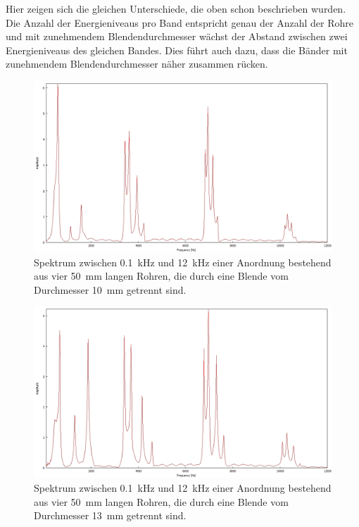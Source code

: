 Hier zeigen sich die gleichen Unterschiede, die oben schon beschrieben wurden.
Die Anzahl der Energieniveaus pro Band entspricht genau der Anzahl der Rohre und mit zunehmendem Blendendurchmesser wächst der Abstand zwischen zwei Energieniveaus des gleichen Bandes.
Dies führt auch dazu, dass die Bänder mit zunehmendem Blendendurchmesser näher zusammen rücken.
\begin{figure}
\centering
\includegraphics[width=\textwidth]{content/messungen/Chapter4b/4b_4_4_10.jpg}
\caption{Spektrum zwischen 0.1~kHz und 12~kHz einer Anordnung bestehend aus vier 50~mm langen Rohren, die durch eine Blende vom Durchmesser 10~mm getrennt sind.}
\label{fig:4b_4_4_10}
\end{figure}
\begin{figure}
\centering
\includegraphics[width=\textwidth]{content/messungen/Chapter4b/4b_4_4_13.jpg}
\caption{Spektrum zwischen 0.1~kHz und 12~kHz einer Anordnung bestehend aus vier 50~mm langen Rohren, die durch eine Blende vom Durchmesser 13~mm getrennt sind.}
\label{fig:4b_4_4_13}
\end{figure}
